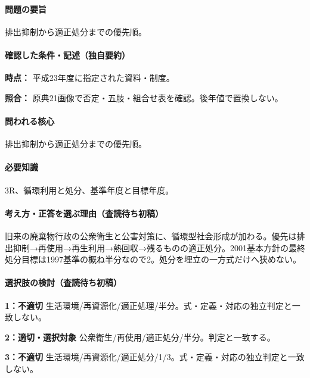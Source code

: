 \paragraph{問題の要旨} 排出抑制から適正処分までの優先順。

\paragraph{確認した条件・記述（独自要約）}\mbox{}\par

\noindent\textbf{時点：} 平成23年度に指定された資料・制度。\par

\noindent\textbf{照合：} 原典21画像で否定・五肢・組合せ表を確認。後年値で置換しない。\par

\paragraph{問われる核心} 排出抑制から適正処分までの優先順。

\paragraph{必要知識} 3R、循環利用と処分、基準年度と目標年度。

\paragraph{考え方・正答を選ぶ理由（査読待ち初稿）} 旧来の廃棄物行政の公衆衛生と公害対策に、循環型社会形成が加わる。優先は排出抑制→再使用→再生利用→熱回収→残るものの適正処分。2001基本方針の最終処分目標は1997基準の概ね半分なので2。処分を埋立の一方式だけへ狭めない。

\paragraph{選択肢の検討（査読待ち初稿）}\mbox{}\par

\noindent\textbf{1：不適切} 生活環境/再資源化/適正処理/半分。式・定義・対応の独立判定と一致しない。\par

\noindent\textbf{2：適切・選択対象} 公衆衛生/再使用/適正処分/半分。判定と一致する。\par

\noindent\textbf{3：不適切} 生活環境/再資源化/適正処分/1/3。式・定義・対応の独立判定と一致しない。\par

